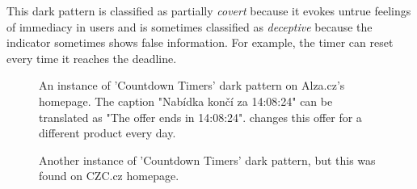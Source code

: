         This dark pattern is classified as partially \emph{covert} because it evokes untrue feelings of immediacy in users and is sometimes classified as \emph{deceptive} because the indicator sometimes shows false information. For example, the timer can reset every time it reaches the deadline.

        \begin{figure}[ht]
            \RawFloats
            \begin{minipage}[t]{0.52\linewidth}
                \strut\vspace*{-\baselineskip}\newline
                \caption{An instance of 'Countdown Timers' dark pattern on Alza.cz's homepage. The caption "Nabídka končí za 14:08:24" can be translated as "The offer ends in 14:08:24". changes this offer for a different product every day.}
                \label{fig:countdown-timers-alza1}
            \end{minipage}
            \hfill
            \begin{minipage}[t]{0.44\linewidth}
                \strut\vspace*{-\baselineskip}\newline
                \caption{Another instance of 'Countdown Timers' dark pattern, but this was found on CZC.cz homepage.}
                \label{fig:countdown-timers-czc}
            \end{minipage}
        \end{figure}

